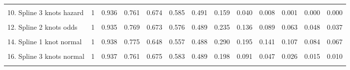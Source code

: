 \documentclass[]{article}
\begin{document}
\begin{table}
{\begin{tabular}[t]{lrrrrrrrrrrrr}
\cellcolor{gray!6}{9. Spline 2 knots hazard} & \cellcolor{gray!6}{1} & \cellcolor{gray!6}{0.935} & \cellcolor{gray!6}{0.766} & \cellcolor{gray!6}{0.673} & \cellcolor{gray!6}{0.579} & \cellcolor{gray!6}{0.490} & \cellcolor{gray!6}{0.184} & \cellcolor{gray!6}{0.061} & \cellcolor{gray!6}{0.018} & \cellcolor{gray!6}{0.005} & \cellcolor{gray!6}{0.001} & \cellcolor{gray!6}{0.000}\\
10. Spline 3 knots hazard & 1 & 0.936 & 0.761 & 0.674 & 0.585 & 0.491 & 0.159 & 0.040 & 0.008 & 0.001 & 0.000 & 0.000\\
\cellcolor{gray!6}{11. Spline 1 knot odds} & \cellcolor{gray!6}{1} & \cellcolor{gray!6}{0.939} & \cellcolor{gray!6}{0.778} & \cellcolor{gray!6}{0.648} & \cellcolor{gray!6}{0.556} & \cellcolor{gray!6}{0.489} & \cellcolor{gray!6}{0.301} & \cellcolor{gray!6}{0.213} & \cellcolor{gray!6}{0.162} & \cellcolor{gray!6}{0.131} & \cellcolor{gray!6}{0.109} & \cellcolor{gray!6}{0.093}\\
12. Spline 2 knots odds & 1 & 0.935 & 0.769 & 0.673 & 0.576 & 0.489 & 0.235 & 0.136 & 0.089 & 0.063 & 0.048 & 0.037\\
\cellcolor{gray!6}{13. Spline 3 knots odds} & \cellcolor{gray!6}{1} & \cellcolor{gray!6}{0.937} & \cellcolor{gray!6}{0.761} & \cellcolor{gray!6}{0.675} & \cellcolor{gray!6}{0.583} & \cellcolor{gray!6}{0.489} & \cellcolor{gray!6}{0.207} & \cellcolor{gray!6}{0.108} & \cellcolor{gray!6}{0.066} & \cellcolor{gray!6}{0.044} & \cellcolor{gray!6}{0.032} & \cellcolor{gray!6}{0.024}\\
14. Spline 1 knot normal & 1 & 0.938 & 0.775 & 0.648 & 0.557 & 0.488 & 0.290 & 0.195 & 0.141 & 0.107 & 0.084 & 0.067\\
\cellcolor{gray!6}{15. Spline 2 knots normal} & \cellcolor{gray!6}{1} & \cellcolor{gray!6}{0.930} & \cellcolor{gray!6}{0.773} & \cellcolor{gray!6}{0.669} & \cellcolor{gray!6}{0.572} & \cellcolor{gray!6}{0.489} & \cellcolor{gray!6}{0.240} & \cellcolor{gray!6}{0.135} & \cellcolor{gray!6}{0.083} & \cellcolor{gray!6}{0.054} & \cellcolor{gray!6}{0.037} & \cellcolor{gray!6}{0.026}\\
16. Spline 3 knots normal & 1 & 0.937 & 0.761 & 0.675 & 0.583 & 0.489 & 0.198 & 0.091 & 0.047 & 0.026 & 0.015 & 0.010\\
\cellcolor{gray!6}{17. Mixture cure Weibull} & \cellcolor{gray!6}{1} & \cellcolor{gray!6}{0.928} & \cellcolor{gray!6}{0.804} & \cellcolor{gray!6}{0.676} & \cellcolor{gray!6}{0.563} & \cellcolor{gray!6}{0.475} & \cellcolor{gray!6}{0.319} & \cellcolor{gray!6}{0.310} & \cellcolor{gray!6}{0.309} & \cellcolor{gray!6}{0.309} & \cellcolor{gray!6}{0.309} & \cellcolor{gray!6}{0.309}\\

\end{tabular}}
\end{table}
\end{document}
